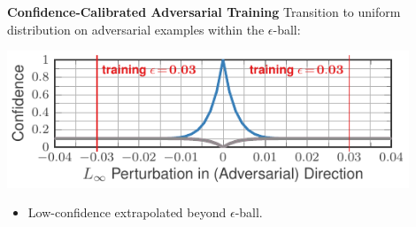 \documentclass[64pt]{beamer}
\newcommand*\circled[1]{\tikz[baseline=(char.base)]{
		\node[shape=circle,draw=MPIIorange,fill=MPIIorange,inner sep=2pt] (char) {\color{MPIIwhite}#1};}}
\begin{document}
    
    \begin{frame}[t]{\bfseries Confidence-Calibrated Adversarial Training}
        \Large
        \circled{1} Transition to uniform distribution on adversarial examples within the $\epsilon$-ball:
	    \vspace*{-0.5cm}
        \begin{center}
            \includegraphics[width=12cm]{fig/transition/confidences_full}
        \end{center}
	    \vskip -0.5cm
	    \begin{itemize}
	    	\item Low-confidence extrapolated beyond $\epsilon$-ball.
	    \end{itemize}
    \end{frame}

\end{document}
